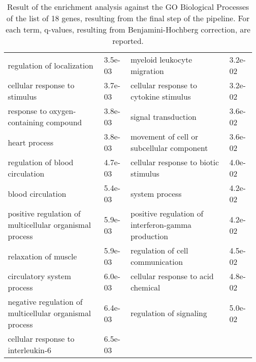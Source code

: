 \documentclass[fleqn,10pt]{SelfArx} %
\begin{document}
\begin{table}[!htb]
\begin{tabularx}{\textwidth}{XlXl}
		regulation of localization & 3.5e-03 & myeloid leukocyte migration & 3.2e-02 \\ 
		cellular response to stimulus & 3.7e-03 & cellular response to cytokine stimulus & 3.2e-02 \\ 
		response to oxygen-containing compound & 3.8e-03 & signal transduction & 3.6e-02 \\ 
		heart process & 3.8e-03 & movement of cell or subcellular component & 3.6e-02 \\ 
		regulation of blood circulation & 4.7e-03 & cellular response to biotic stimulus & 4.0e-02 \\ 
		blood circulation & 5.4e-03 & system process & 4.2e-02 \\ 
		positive regulation of multicellular organismal process & 5.9e-03 & positive regulation of interferon-gamma production & 4.2e-02 \\ 
		relaxation of muscle & 5.9e-03 & regulation of cell communication & 4.5e-02 \\ 
		circulatory system process & 6.0e-03 & cellular response to acid chemical & 4.8e-02 \\ 
		negative regulation of multicellular organismal process & 6.4e-03 & regulation of signaling & 5.0e-02 \\ 
		cellular response to interleukin-6 & 6.5e-03 &  &  \\ 
	\end{tabularx}
	\smallskip
	\caption{Result of the enrichment analysis against the GO Biological Processes of the list of 18 genes, resulting from the final step of the pipeline. For each term, q-values, resulting from Benjamini-Hochberg correction, are reported.}
	\label{tab:GO18}
\end{table}
\end{document}
